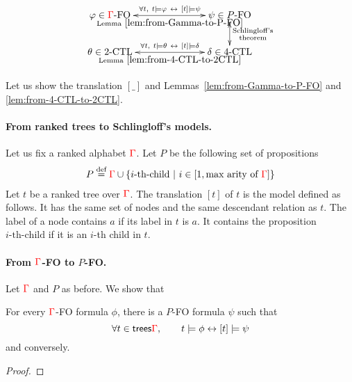  
    $$\xymatrix@C=2.5cm{
        \varphi \in \rGamma\text{-FO} 
        \ar@{<->}[r]^{\forall t, \ t\models \varphi \ \leftrightarrow \ [t] \models \psi}_{\text{Lemma}~\ref{lem:from-Gamma-to-P-FO}}
        &
        \psi \in P \text{-FO}
        \ar@{<->}[d]^{\substack{\text{Schlingloff's}\\\text{theorem}}} \\
       \theta \in \text{2-CTL}
        \ar@{<->}[r]^{\forall t, \ t\models \theta \ \leftrightarrow \ [t] \models \delta}_{\text{Lemma}~\ref{lem:from-4-CTL-to-2CTL}}
        &
        \delta \in \text{4-CTL}
    }$$    

 Let us show the translation $[\_]$ and Lemmas~\ref{lem:from-Gamma-to-P-FO} and \ref{lem:from-4-CTL-to-2CTL}.

\paragraph{From ranked trees to Schlingloff's models.} Let us fix a ranked alphabet ${\color{red}{\Gamma}}$. Let $P$ be the following set of propositions
\begin{align*}
P\stackrel{\text{def}}= {\color{red}{\Gamma}}\cup\{i\text{-th-child}\ |\ i\in[1, \text{max arity of }{\color{red}{\Gamma}}]\}
\end{align*}
 Let $t$ be a ranked tree over ${\color{red}{\Gamma}}$. The translation $[t]$ of $t$ is the model defined as follows. It has the same set of nodes and the same descendant relation as $t$. The label of a node contains $a$ if its label in $t$ is $a$. It contains the proposition $i\text{-th-child}$ if it is an $i$-th child in $t$.

\paragraph{From ${\color{red}{\Gamma}}$-FO to $P$-FO.} Let ${\color{red}{\Gamma}}$ and $P$ as before. We show that
\begin{lemma}\label{lem:from-Gamma-to-P-FO}
For every ${\color{red}{\Gamma}}$-FO formula $\phi$, there is a $P$-FO formula $\psi$ such that
$$ \forall t\in \mathsf {trees}{\color{red}{\Gamma}}, \qquad t\models \phi \leftrightarrow [t]\models \psi$$
and conversely.
\end{lemma}
\begin{proof}

\end{proof}

